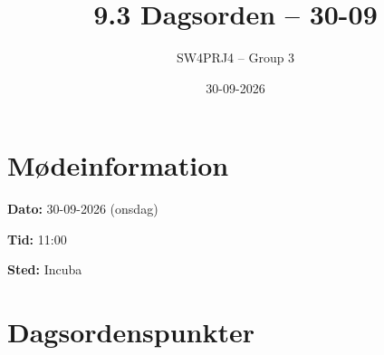 \documentclass[a4paper,11pt]{article}
\title{9.3 Dagsorden -- 30-09}
\author{SW4PRJ4 -- Group 3}
\date{30-09-2026}
\begin{document}
\maketitle

\section*{Mødeinformation}

\textbf{Dato:} 30-09-2026 (onsdag)

\textbf{Tid:} 11:00

\textbf{Sted:} Incuba

\section*{Dagsordenspunkter}
\end{document}
